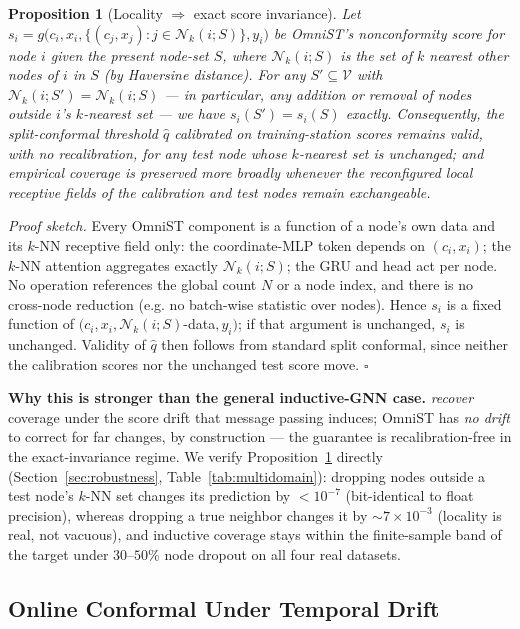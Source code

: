 \documentclass[journal]{IEEEtran}
\newtheorem{proposition}{Proposition}
\begin{document}
\begin{proposition}[Locality $\Rightarrow$ exact score invariance]
\label{prop:locality}
Let $s_i = g\big(c_i, x_i, \{(c_j,x_j): j\in\mathcal{N}_k(i;S)\}, y_i\big)$ be OmniST's nonconformity
score for node $i$ given the present node-set $S$, where $\mathcal{N}_k(i;S)$ is the set of $k$ nearest
\emph{other} nodes of $i$ in $S$ (by Haversine distance). For any $S' \subseteq \mathcal{V}$ with
$\mathcal{N}_k(i;S') = \mathcal{N}_k(i;S)$ --- in particular, any addition or removal of nodes outside
$i$'s $k$-nearest set --- we have $s_i(S') = s_i(S)$ exactly. Consequently, the split-conformal
threshold $\hat q$ calibrated on training-station scores remains valid, \emph{with no recalibration},
for any test node whose $k$-nearest set is unchanged; and empirical coverage is preserved more
broadly whenever the reconfigured local receptive fields of the calibration and test nodes remain
exchangeable.
\end{proposition}

\emph{Proof sketch.} Every OmniST component is a function of a node's own data and its $k$-NN
receptive field only: the coordinate-MLP token depends on $(c_i,x_i)$; the $k$-NN attention
aggregates exactly $\mathcal{N}_k(i;S)$; the GRU and head act per node. No operation references the
global count $N$ or a node index, and there is no cross-node reduction (e.g. no batch-wise statistic
over nodes). Hence $s_i$ is a fixed function of $\big(c_i,x_i,\mathcal{N}_k(i;S)$-data$,y_i\big)$; if
that argument is unchanged, $s_i$ is unchanged. Validity of $\hat q$ then follows from standard
split conformal, since neither the calibration scores nor the unchanged test score move. $\square$

\textbf{Why this is stronger than the general inductive-GNN case.} \cite{conformalinductivegnn2024}
\emph{recover} coverage under the score drift that message passing induces; OmniST has \emph{no drift}
to correct for far changes, by construction --- the guarantee is recalibration-free in the
exact-invariance regime. We verify Proposition~\ref{prop:locality} directly
(Section~\ref{sec:robustness}, Table~\ref{tab:multidomain}): dropping nodes outside a test node's
$k$-NN set changes its prediction by $<10^{-7}$ (bit-identical to float precision), whereas dropping
a true neighbor changes it by $\sim 7\times10^{-3}$ (locality is real, not vacuous), and inductive
coverage stays within the finite-sample band of the target under $30$--$50\%$ node dropout on all
four real datasets.

\subsection{Online Conformal Under Temporal Drift}
\label{sec:online-conformal}
\end{document}
